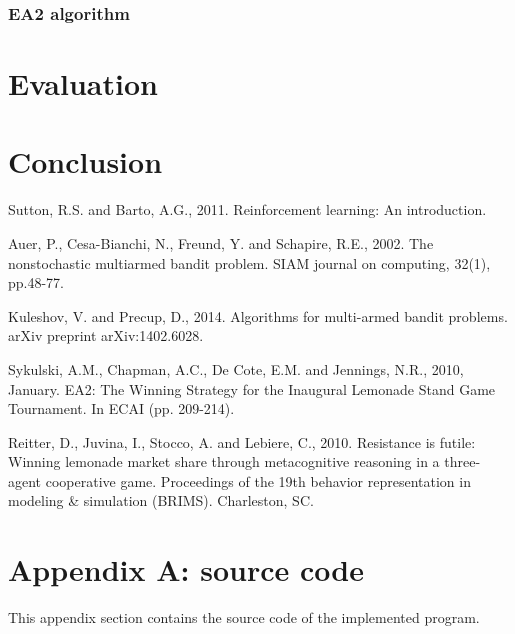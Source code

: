 \documentclass[runningheads]{llncs}
\begin{document}
\subsubsection{EA2 algorithm}


\section{Evaluation}

\section{Conclusion}

\begin{thebibliography}{8}

Sutton, R.S. and Barto, A.G., 2011. Reinforcement learning: An
introduction.

Auer, P., Cesa-Bianchi, N., Freund, Y. and Schapire, R.E., 2002. The
nonstochastic multiarmed bandit problem. SIAM journal on computing,
32(1), pp.48-77.

Kuleshov, V. and Precup, D., 2014. Algorithms for multi-armed bandit
problems. arXiv preprint arXiv:1402.6028.

Sykulski, A.M., Chapman, A.C., De Cote, E.M. and Jennings, N.R., 2010,
January. EA2: The Winning Strategy for the Inaugural Lemonade Stand
Game Tournament. In ECAI (pp. 209-214).

Reitter, D., Juvina, I., Stocco, A. and Lebiere, C., 2010. Resistance
is futile: Winning lemonade market share through metacognitive
reasoning in a three-agent cooperative game. Proceedings of the 19th
behavior representation in modeling \& simulation (BRIMS). Charleston,
SC.
  
\end{thebibliography}

\section{Appendix A: source code}\label{appendix}
This appendix section contains the source code of the implemented program.

\end{document}
